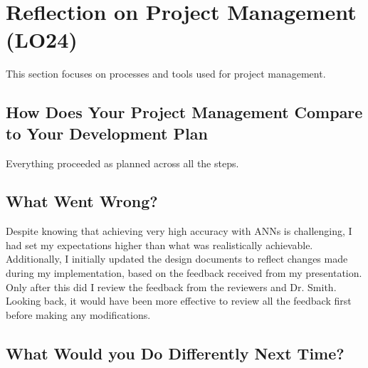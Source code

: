 \documentclass{article}
\begin{document}

\section{Reflection on Project Management (LO24)}

This section focuses on processes and tools used for project management.

\subsection{How Does Your Project Management Compare to Your Development Plan}

Everything proceeded as planned across all the steps.



\subsection{What Went Wrong?}

Despite knowing that achieving very high accuracy with ANNs is 
challenging, I had set my expectations higher than what was realistically 
achievable. Additionally, I initially updated the design documents to 
reflect changes made during my implementation, based on the feedback 
received from my presentation. Only after this did I review the 
feedback from the reviewers and Dr. Smith. Looking back, it would 
have been more effective to review all the feedback first before making 
any modifications.

\subsection{What Would you Do Differently Next Time?}
\end{document}
